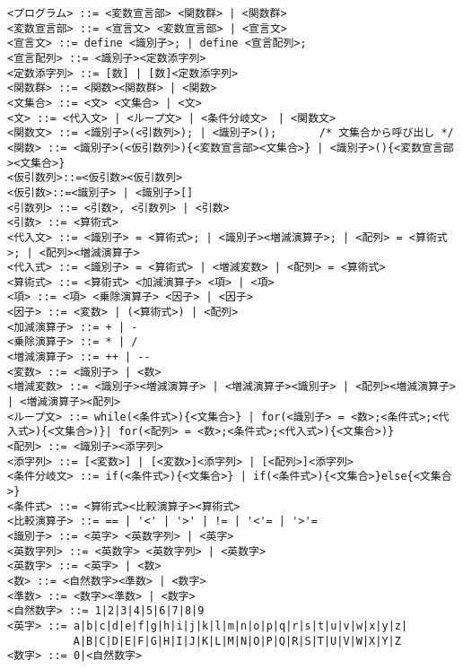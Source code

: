 \documentclass[a4j]{jarticle}
\begin{document}
\begin{verbatim}
<プログラム> ::= <変数宣言部> <関数群> | <関数群>
<変数宣言部> ::= <宣言文> <変数宣言部> | <宣言文>
<宣言文> ::= define <識別子>; | define <宣言配列>;
<宣言配列> ::= <識別子><定数添字列>
<定数添字列> ::= [数] | [数]<定数添字列>
<関数群> ::= <関数><関数群> | <関数>
<文集合> ::= <文> <文集合> | <文>
<文> ::= <代入文> | <ループ文> | <条件分岐文>　| <関数文> 
<関数文> ::= <識別子>(<引数列>); | <識別子>();　　　　/* 文集合から呼び出し */
<関数> ::= <識別子>(<仮引数列>){<変数宣言部><文集合>} | <識別子>(){<変数宣言部><文集合>}
<仮引数列>::=<仮引数><仮引数列>
<仮引数>::=<識別子> | <識別子>[]
<引数列> ::= <引数>, <引数列> | <引数>
<引数> ::= <算術式>
<代入文> ::= <識別子> = <算術式>; | <識別子><増減演算子>; | <配列> = <算術式>; | <配列><増減演算子>
<代入式> ::= <識別子> = <算術式> | <増減変数> | <配列> = <算術式>
<算術式> ::= <算術式> <加減演算子> <項> | <項> 
<項> ::= <項> <乗除演算子> <因子> | <因子>
<因子> ::= <変数> | (<算術式>) | <配列>
<加減演算子> ::= + | -
<乗除演算子> ::= * | /
<増減演算子> ::= ++ | --
<変数> ::= <識別子> | <数>
<増減変数> ::= <識別子><増減演算子> | <増減演算子><識別子> | <配列><増減演算子> | <増減演算子><配列>
<ループ文> ::= while(<条件式>){<文集合>} | for(<識別子> = <数>;<条件式>;<代入式>){<文集合>)}| for(<配列> = <数>;<条件式>;<代入式>){<文集合>)}
<配列> ::= <識別子><添字列> 
<添字列> ::= [<変数>] | [<変数>]<添字列> | [<配列>]<添字列>
<条件分岐文> ::= if(<条件式>){<文集合>} | if(<条件式>){<文集合>}else{<文集合>}
<条件式> ::= <算術式><比較演算子><算術式>
<比較演算子> ::= == | '<' | '>' | != | '<'= | '>'=
<識別子> ::= <英字> <英数字列> | <英字>
<英数字列> ::= <英数字> <英数字列> | <英数字>
<英数字> ::= <英字> | <数>
<数> ::= <自然数字><準数> | <数字>
<準数> ::= <数字><準数> | <数字>
<自然数字> ::= 1|2|3|4|5|6|7|8|9
<英字> ::= a|b|c|d|e|f|g|h|i|j|k|l|m|n|o|p|q|r|s|t|u|v|w|x|y|z|
　　　　　  A|B|C|D|E|F|G|H|I|J|K|L|M|N|O|P|Q|R|S|T|U|V|W|X|Y|Z
<数字> ::= 0|<自然数字>
\end{verbatim}
\end{document}
